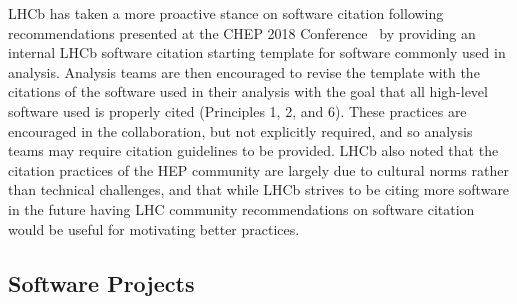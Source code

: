 LHCb has taken a more proactive stance on software citation following recommendations presented at the CHEP 2018 Conference~\cite{CHEP-2018-recommendations} by providing an internal LHCb software citation starting template for software commonly used in analysis.
Analysis teams are then encouraged to revise the template with the citations of the software used in their analysis with the goal that all high-level software used is properly cited (Principles 1, 2, and 6).
These practices are encouraged in the collaboration, but not explicitly required, and so analysis teams may require citation guidelines to be provided.
LHCb also noted that the citation practices of the HEP community are largely due to cultural norms rather than technical challenges, and that while LHCb strives to be citing more software in the future having LHC community recommendations on software citation would be useful for motivating better practices.

\subsection{Software Projects}\label{sec:software_projects}

